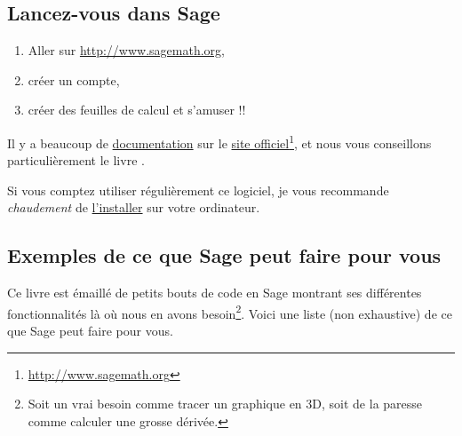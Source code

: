 \subsection{Lancez-vous dans Sage}
\label{SUBooINTROsageLancezVous}


\begin{enumerate}
	\item
	      Aller sur \url{http://www.sagemath.org},
	\item
	      créer un compte,
	\item
	      créer des feuilles de calcul et s'amuser !!
\end{enumerate}

Il y a beaucoup de \href{http://lmgtfy.com/?q=sage+documentation}{documentation} sur le \href{http://www.sagemath.org}{site officiel}\footnote{\href{http://www.sagemath.org}{http://www.sagemath.org}}, et nous vous conseillons particulièrement le livre \cite{ooBLMMooWTPsQy}.

Si vous comptez utiliser régulièrement ce logiciel, je vous recommande \emph{chaudement} de \href{http://mirror.switch.ch/mirror/sagemath/index.html}{l'installer} sur votre ordinateur.

\subsection{Exemples de ce que Sage peut faire pour vous}
\label{SUBooINTROsageExemples}

Ce livre est émaillé de petits bouts de code en Sage montrant ses différentes fonctionnalités là où nous en avons besoin\footnote{Soit un vrai besoin comme tracer un graphique en 3D, soit de la paresse comme calculer une grosse dérivée.}. Voici une liste (non exhaustive) de ce que Sage peut faire pour vous.

